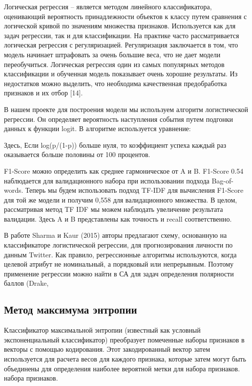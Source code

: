 Логическая регрессия – является методом линейного классификатора, оценивающий
вероятность принадлежности объектов к классу путем сравнения с логической кривой
по значениям множества признаков. Используется как для задач регрессии, так и
для классификации.  На практике часто рассматривается логическая регрессия с
регуляризацией. Регуляризация заключается в том, что модель начинает штрафовать
за очень большие веса, что не дает модели переобучиться. Логическая регрессия
один из самых популярных методов классификации и обученная модель показывает
очень хорошие результаты. Из недостатков можно выделить, что необходима
качественная предобработка признаков и их отбор [14].~\cite{article9}

В нашем проекте для построения модели мы используем алгоритм логистической
регрессии. Он определяет вероятность наступления события путем подгонки данных к
функции logit. В алгоритме используется уравнение:

Здесь, Если log(p/(1-p)) больше нуля, то коэффициент успеха каждый раз
оказывается больше половины от 100 процентов.

F1-Score можно определить как среднее гармоническое от A и B. F1-Score 0.54
наблюдается для валидационного набора при использовании подхода Bag-of-words.
Теперь мы будем использовать подход TF-IDF для вычисления F1-Score для той же
модели и получим 0,558 для валидационного множества. В целом, рассматривая метод
TF IDF мы можем наблюдать увеличение результата валидации. Здесь A и B
представлены как точность и recall соответственно.~\cite{article12}


В работе Sharma и Kaur (2015) авторы предлагают схему, основанную на
классификаторе логистической регрессии, для прогнозирования личности по данным
Twitter.  Как правило, регрессионные алгоритмы используются, когда целевой
атрибут не номинальный, а порядковый или непрерывным. Поэтому применение
регрессии можно найти в СА для задач определения полярности баллов (Drake,
\cite{article13}

\subsection{Метод максимума энтропии}

Классификатор максимальной энтропии (известный как условный экспоненциальный
классификатор) преобразует помеченные наборы признаков в векторы с помощью
кодирования. Этот закодированный вектор затем используется для расчета весов для
каждого признака, которые затем могут быть объединены для определения наиболее
вероятной метки для набора признаков. набора признаков.~\cite{article4}

